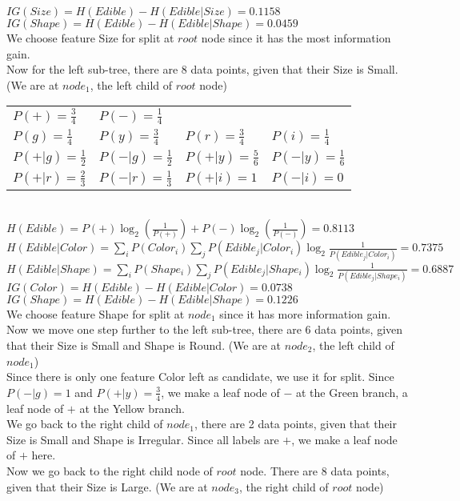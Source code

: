 \documentclass[11pt,a4paper,fleqn]{article}
\begin{document}
$IG(Size) = H(Edible) - H(Edible|Size) = 0.1158$\\
$IG(Shape) = H(Edible) - H(Edible|Shape) = 0.0459$\\
We choose feature Size for split at $root$ node since it has the most information gain.\\
Now for the left sub-tree, there are 8 data points, given that their Size is Small. (We are at $node_1$, the left child of $root$ node)\\
\begin{tabular}{llll}
$P(+) = \frac{3}{4}$&$P(-) = \frac{1}{4}$&&\\
$P(g)=\frac{1}{4}$&$P(y)=\frac{3}{4}$&$P(r)=\frac{3}{4}$&$P(i)=\frac{1}{4}$\\
$P(+|g)=\frac{1}{2}$&$P(-|g)=\frac{1}{2}$&$P(+|y)=\frac{5}{6}$&$P(-|y)=\frac{1}{6}$\\
$P(+|r)=\frac{2}{3}$&$P(-|r)=\frac{1}{3}$&$P(+|i)=1$&$P(-|i)=0$\\
\end{tabular}\\
$H(Edible) =  P(+)\log_2(\frac{1}{P(+)})+P(-)\log_2(\frac{1}{P(-)})=0.8113$\\
$H(Edible|Color) = \sum_iP(Color_i)\sum_jP(Edible_j|Color_i)\log_2\frac{1}{P(Edible_j|Color_i)}=0.7375$\\
$H(Edible|Shape) = \sum_iP(Shape_i)\sum_jP(Edible_j|Shape_i)\log_2\frac{1}{P(Edible_j|Shape_i)}=0.6887$\\
$IG(Color) = H(Edible) - H(Edible|Color) = 0.0738$\\
$IG(Shape) = H(Edible) - H(Edible|Shape) = 0.1226$\\
We choose feature Shape for split at $node_1$ since it has more information gain.\\
Now we move one step further to the left sub-tree, there are 6 data points, given that their Size is Small and Shape is Round. (We are at $node_2$, the left child of $node_1$)\\
Since there is only one feature Color left as candidate, we use it for split. Since $P(-|g)=1$ and $P(+|y) = \frac{3}{4}$, we make a leaf node of $-$ at the Green branch, a leaf node of $+$ at the Yellow branch.\\
We go back to the right child of $node_1$, there are 2 data points, given that their Size is Small and Shape is Irregular. Since all labels are $+$, we make a leaf node of $+$ here.\\
Now we go back to the right child node of $root$ node. There are 8 data points, given that their Size is Large. (We are at $node_3$, the right child of $root$ node)\\
\end{document}
